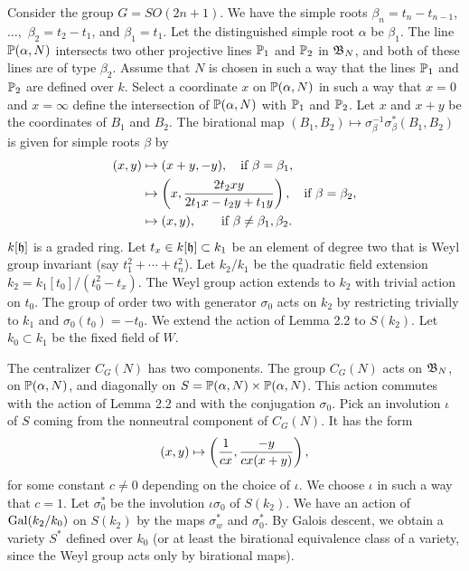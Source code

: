 \documentclass{amsart}
\begin{document}
  Consider the group $G=SO(2n+1)$.  We have the simple
roots $\beta_n = t_n-t_{n-1}$, $\ldots,$ $\beta_2 = t_2-t_1$, and
$\beta_1 = t_1$.  Let the distinguished simple root $\alpha$ be $\beta_1$.
The line ${\Bbb P}(\alpha,N)$ intersects two other projective lines
${\Bbb P}_1$ and  ${\Bbb P}_2$ in ${\frak B}_N$, and both of these lines are of type $\beta_2$.
Assume that $N$ is chosen in such a way that the lines ${\Bbb P}_1$ and
${\Bbb P}_2$ are defined over $k$.  Select a coordinate $x$ on ${\Bbb P}(\alpha,N)$
in such a way that $x=0$ and $x=\infty$ define the intersection
of ${\Bbb P}(\alpha,N)$ with ${\Bbb P}_1$ and ${\Bbb P}_2$.  Let $x$ and $x+y$ be the
coordinates of $B_1$ and $B_2$.  The birational map $(B_1,B_2)\mapsto
\sigma_\beta^{-1}\sigma_\beta^*(B_1,B_2)$ is given for simple roots
$\beta$ by
\begin{align*}
(x,y)&\mapsto (x+y,-y),\quad\hbox{if } \beta=\beta_1,\\
     &\mapsto \left(x ,{2t_2xy\over 2t_1x-t_2y+t_1y}\right),
              \quad\hbox{if } \beta=\beta_2,\\
     &\mapsto (x,y),\qquad\hbox{if } \beta\ne \beta_1,\beta_2.
\end{align*}
$k[{\frak h}]$ is a graded ring.  Let $t_{x}\in k[{\frak h}]\subset k_1$ be an
element of degree two that is Weyl group invariant (say
$t_1^2+\cdots+t_n^2$).  Let $k_2/k_1$
be the quadratic field extension $k_2 = k_1[t_{0}]/(t_0^2 - t_{x})$.
The Weyl group action extends to $k_2$ with trivial action on $t_{0}$.
The group of order two with generator $\sigma_0$ acts on $k_2$ by
restricting trivially to $k_1$ and $\sigma_0(t_0)= -t_0$.  We extend
the action of Lemma 2.2 to $S(k_2)$.  Let $k_0\subset k_1$ be the
fixed field of $W$.

The centralizer $C_G(N)$ has two components.  The group $C_G(N)$ acts
on ${\frak B}_N$, on ${\Bbb P}(\alpha,N)$, and diagonally on $S = {\Bbb P}(\alpha,N)\times
{\Bbb P}(\alpha,N)$.  This action commutes with the action of Lemma 2.2
and with the conjugation $\sigma_0$.  Pick an involution $\iota$
of $S$ coming from the nonneutral component of $C_G(N)$.
It has the form
$$
(x,y)\mapsto \left({1\over cx},{-y\over c x(x+y)}\right),
$$
for some constant $c\ne0$ depending on the choice of $\iota$.
We choose $\iota$ in such a way that $c=1$.
  Let
$\sigma_0^*$ be the involution $\iota\sigma_0$ of $S(k_2)$.
We have an action of $\operatorname{Gal}(k_2/k_0)$ on $S(k_2)$ by the maps
$\sigma^*_w$ and $\sigma^*_0$.  By Galois descent, we obtain
a variety $S^*$ defined over $k_0$ (or at least the birational
equivalence class of a variety, since the Weyl group acts only
by birational maps).   
\end{document}
